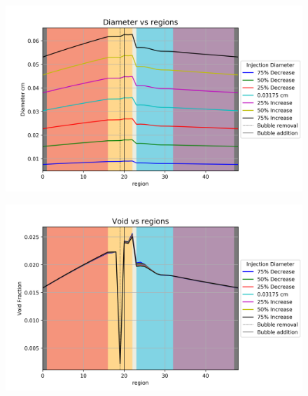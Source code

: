 \begin{figure}[p] 
\centering
\begin{minipage}{.5\textwidth}
  \centering
  \includegraphics[width=1.0\linewidth]{images/InjectedDiameter.png}
  \label{fig:InjectedDia}
\end{minipage}%
\begin{minipage}{.5\textwidth}
  \centering
  \includegraphics[width=1.0\linewidth]{images/InjectedVoid.png}
  \label{fig:InjectedVoid}
\end{minipage}
\end{figure}

